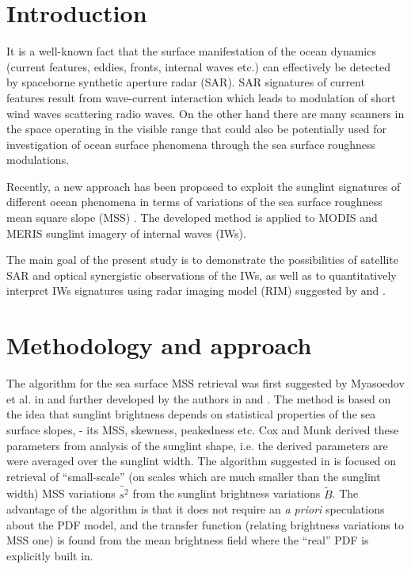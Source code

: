 \documentclass[draft,grl]{agutex}
\begin{document}
\begin{article}

%
%


\section{Introduction}

It is a well-known fact that the surface manifestation of the ocean dynamics (current features, eddies, fronts, internal waves etc.) can effectively be detected by spaceborne synthetic aperture radar (SAR). SAR signatures of current features result from wave-current interaction which leads to modulation of short wind waves scattering radio waves. On the other hand there are many scanners in the space operating in the visible range that could also be potentially used for investigation of ocean surface phenomena through the sea surface roughness modulations.

Recently, a new approach has been proposed to exploit the sunglint signatures of different ocean phenomena in terms of variations of the sea surface roughness mean square slope (MSS) \citep{Kudryavtsev2012a}. The developed method is applied to MODIS and MERIS sunglint imagery of internal waves (IWs). 

The main goal of the present study is to demonstrate the possibilities of satellite SAR and optical synergistic observations of the IWs, as well as to quantitatively interpret IWs signatures using radar imaging model (RIM) suggested by \cite{Kudryavtsev2005} and \cite{Johannessen2005}.


\section{Methodology and approach}

The algorithm for the sea surface MSS retrieval was first suggested by Myasoedov et al. in \citep{Myasoedov2010a} and further developed by the authors in \citep{Kudryavtsev2012a} and \citep{Kudryavtsev2012b}. The method is based on the idea that sunglint brightness depends on statistical properties of the sea surface slopes, - its MSS, skewness, peakedness etc. Cox and Munk \citep{Cox1954} derived these parameters from analysis of the sunglint shape, i.e. the derived parameters are were averaged over the sunglint width. The algorithm suggested in \citep{Kudryavtsev2012a} is focused on retrieval of ``small-scale'' (on scales which are much smaller than the sunglint width) MSS variations $\tilde{s^2}$ from the sunglint brightness variations $\tilde{B}$. The advantage of the algorithm is that it does not require an \textit{a priori} speculations about the PDF model, and the transfer function (relating brightness variations to MSS one) is found from the mean brightness field where the ``real'' PDF is explicitly built in.



\end{article}
\end{document}
